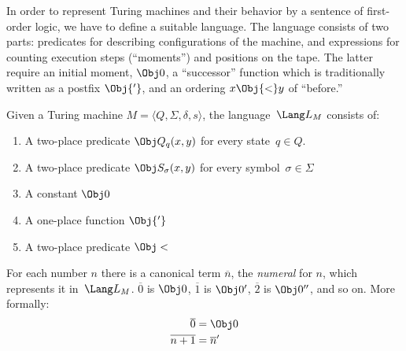 \documentclass[../../include/open-logic-section]{subfiles}
\begin{document}

\begin{wordy}
In order to represent Turing machines and their behavior by a sentence
of first-order logic, we have to define a suitable language. The
language consists of two parts: predicates for describing
configurations of the machine, and expressions for counting execution
steps (``moments'') and positions on the tape. The latter require an
initial moment, $\Obj 0$, a ``successor'' function which is
traditionally written as a postfix $\Obj{'}$, and an ordering $x
\Obj{<} y$ of ``before.''
\end{wordy}

\begin{defn}
Given a Turing machine $M = \langle Q, \Sigma, \delta, s\rangle$, the
language~$\Lang L_M$ consists of:
\begin{enumerate}
\item A two-place predicate $\Obj Q_q(x, y)$ for every state~$q \in Q$.
\item A two-place predicate $\Obj S_\sigma(x, y)$ for every
  symbol~$\sigma\in \Sigma$
\item A constant $\Obj 0$
\item A one-place function $\Obj{'}$
\item A two-place predicate $\Obj <$
\end{enumerate}
\end{defn}

For each number $n$ there is a canonical term $\overline n$, the
\emph{numeral} for $n$, which represents it in~$\Lang L_M$. $\overline
0$ is $\Obj 0$, $\overline 1$ is $\Obj 0'$, $\overline 2$ is $\Obj
0''$, and so on. More formally:
\begin{align*}
\overline 0 & = \Obj 0 \\
\overline{n+1} &= \overline{n}'
\end{align*}
\end{document}
